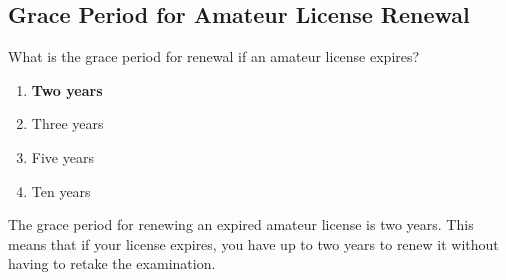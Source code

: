 \subsection{Grace Period for Amateur License Renewal}
\label{T1C09}

\begin{tcolorbox}[colback=gray!10!white,colframe=black!75!black,title=T1C09]
What is the grace period for renewal if an amateur license expires?
\begin{enumerate}[label=\Alph*,noitemsep]
    \item \textbf{Two years}
    \item Three years
    \item Five years
    \item Ten years
\end{enumerate}
\end{tcolorbox}

The grace period for renewing an expired amateur license is two years. This means that if your license expires, you have up to two years to renew it without having to retake the examination.